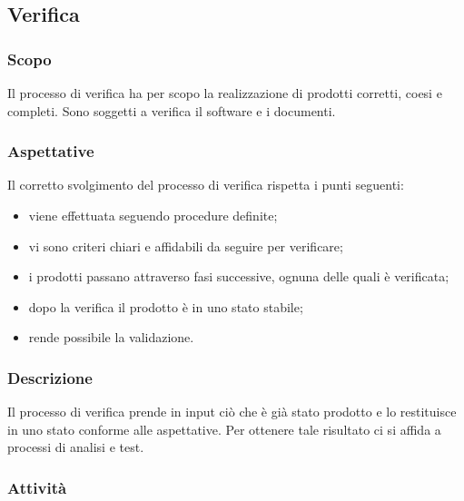 \subsection{Verifica}
	\subsubsection{Scopo}
	Il processo di verifica ha per scopo la realizzazione di prodotti corretti, coesi e completi. Sono soggetti a verifica il software e i documenti. 
	\subsubsection{Aspettative}
	Il corretto svolgimento del processo di verifica rispetta i punti seguenti:	
	\begin{itemize}
		\item viene effettuata seguendo procedure definite;
		\item vi sono criteri chiari e affidabili da seguire per verificare;
		\item i prodotti passano attraverso fasi successive, ognuna delle quali è verificata;
		\item dopo la verifica il prodotto è in uno stato stabile;
		\item rende possibile la validazione.
	\end{itemize}
	\subsubsection{Descrizione}
	Il processo di verifica prende in input ciò che è già stato prodotto e lo restituisce in uno stato conforme alle aspettative. Per ottenere tale risultato ci si affida a processi di analisi e test.
	\subsubsection{Attività}
